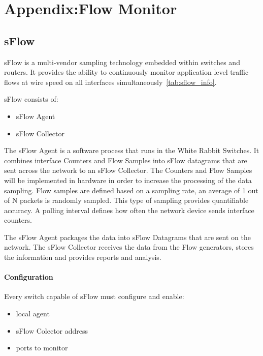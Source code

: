 \chapter{Appendix:Flow Monitor} 
\label{appSFlow}

\section{sFlow}

sFlow is a multi-vendor sampling technology embedded within switches and
routers. It provides the ability to continuously monitor application level
traffic flows at wire speed on all interfaces
simultaneously~\ref{tab:sflow_info}.


sFlow consists of:

\begin{itemize}
	\item sFlow Agent 
	\item sFlow Collector
\end{itemize}

The sFlow Agent is a software process that runs in the White Rabbit Switches.
 It combines interface Counters and Flow Samples into sFlow datagrams that are
sent across the network to an sFlow Collector. The Counters and Flow Samples
will be implemented in hardware in order to increase the
processing of the data sampling. Flow samples are defined based on a sampling
rate, an average of 1 out of N packets is randomly sampled. This type of
sampling provides  quantifiable accuracy. A polling interval defines how often
the network device sends interface counters. 

The sFlow Agent packages the data into sFlow Datagrams that are sent on the
network. The sFlow Collector receives the data from the Flow generators, stores
the information and provides reports and analysis. 

\subsubsection{Configuration}

Every switch capable of sFlow must configure and enable:

\begin{itemize}
	\item local agent
	\item sFlow Colector address 
	\item ports to monitor
\end{itemize}

